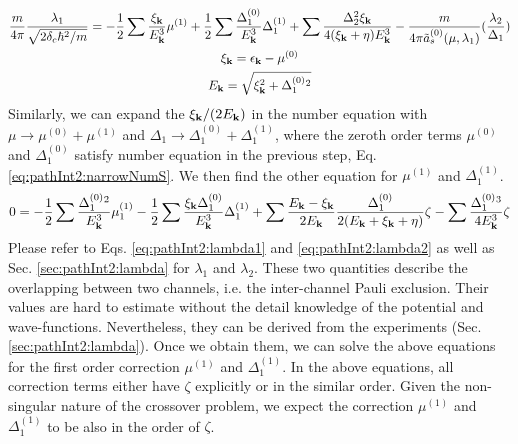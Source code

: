 \begin{gather}
\frac{m}{4\pi}\frac{\lambda_1}{\sqrt{2\delta_{c}\hbar^{2}/m}}=-\frac{1}{2}\sum\frac{\xi_{\mathbf{k}}}{E_{\mathbf{k}}^3}\mu^{(1)}
+\frac{1}{2}\sum\frac{\Delta_1^{(0)}}{E_{\mathbf{k}}^3}\Delta_1^{(1)}+\sum\frac{\Delta_{2}^{2}\xi_{\mathbf{k}}}{4(\xi_{\mathbf{k}}+\eta){E_{\mathbf{k}}^{3}}}
-\frac{m}{4\pi{\tilde{a}^{{(0)}}_{s}(\mu,\lambda_{1})}}(\frac{\lambda_{2}}{\Delta_{1}})\\
\xi_{\mathbf{k}}=\epsilon_{\mathbf{k}}-\mu^{(0)}\\
E_{\mathbf{k}}=\sqrt{\xi_{\mathbf{k}}^2+\Delta_1^{(0)}{}^2}
\end{gather}
Similarly, we can expand the $\xi_{\mathbf{k}}/(2E_{\mathbf{k}})$ in the number equation  with $\mu\to\mu^{(0)}+\mu^{(1)}$ and $\Delta_1\to\Delta_1^{(0)}+\Delta_1^{(1)}$, where the zeroth order terms $\mu^{(0)}$ and $\Delta_1^{(0)}$ satisfy number equation in the previous step, Eq. \ref{eq:pathInt2:narrowNumS}.  We then find the other equation for  $\mu^{(1)}$ and $\Delta_1^{(1)}$. 
\begin{gather}
0=-\frac{1}{2}\sum\frac{\Delta_1^{(0)}{}^2}{E_{\mathbf{k}}^3}\mu_1^{(1)}-\frac{1}{2}\sum\frac{\xi_{\mathbf{k}}\Delta_1^{(0)}}{E_{\mathbf{k}}^3}\Delta_1^{(1)}+
\sum\frac{E_{\mathbf{k}}-\xi_{\mathbf{k}}}{2E_{\mathbf{k}}}\frac{\Delta_{1}^{(0)}}{2(E_{\mathbf{k}}+\xi_{\mathbf{k}}+\eta)}\zeta
 -\sum\frac{\Delta_{1}^{(0)}{}^{3}}{4E_{\mathbf{k}}^{3}}\zeta
\end{gather}
Please refer to   Eqs. \ref{eq:pathInt2:lambda1} and \ref{eq:pathInt2:lambda2} as well as Sec. \ref{sec:pathInt2:lambda} for $\lambda_{1}$ and $\lambda_{2}$.  These two quantities describe the overlapping between two channels, i.e. the inter-channel Pauli exclusion.  Their values are hard to estimate without the detail knowledge of the potential and wave-functions.  Nevertheless, they can be derived from the experiments (Sec. \ref{sec:pathInt2:lambda}). Once we obtain them, we can  solve the above equations  for the first order correction  $\mu^{(1)}$ and $\Delta_1^{(1)}$. In the above equations, all correction terms either have $\zeta$ explicitly or in the similar order.   Given the non-singular nature of the crossover problem, we  expect the correction $\mu^{(1)}$ and $\Delta_1^{(1)}$ to be also in the order of $\zeta$.  


